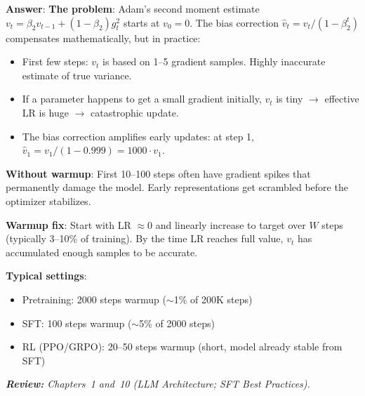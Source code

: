 \begin{questionbox}
\textbf{Answer}: \textbf{The problem}: Adam’s second moment estimate $v_t = \beta_2 v_{t-1} + (1-\beta_2)g_t^2$ starts at $v_0 = 0$. The bias correction $\hat{v}_t = v_t/(1-\beta_2^t)$ compensates mathematically, but in practice:

\begin{itemize}
  \item First few steps: $v_t$ is based on 1--5 gradient samples. Highly inaccurate estimate of true variance.
  \item If a parameter happens to get a small gradient initially, $v_t$ is tiny $\rightarrow$ effective LR is huge $\rightarrow$ catastrophic update.
  \item The bias correction amplifies early updates: at step 1, $\hat{v}_1 = v_1/(1-0.999) = 1000 \cdot v_1$.
\end{itemize}

\textbf{Without warmup}: First 10--100 steps often have gradient spikes that permanently damage the model. Early representations get scrambled before the optimizer stabilizes.

\textbf{Warmup fix}: Start with LR $\approx 0$ and linearly increase to target over $W$ steps (typically 3--10\% of training). By the time LR reaches full value, $v_t$ has accumulated enough samples to be accurate.

\textbf{Typical settings}:

\begin{itemize}
  \item Pretraining: 2000 steps warmup ($\sim$1\% of 200K steps)
  \item SFT: 100 steps warmup ($\sim$5\% of 2000 steps)
  \item RL (PPO/GRPO): 20--50 steps warmup (short, model already stable from SFT)
\end{itemize}

\emph{\textbf{Review:} Chapters~1 and~10 (LLM Architecture; SFT Best Practices).}
\end{questionbox}


